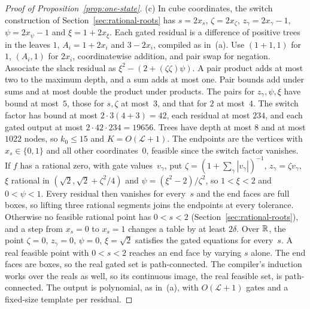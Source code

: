 \begin{proof}[Proof of Proposition~\ref{prop:one-state}]
(c) In cube coordinates, the switch construction of
Section~\ref{sec:rational-roots} has $s=2x_s$, $\zeta=2x_\zeta$,
$z_\gamma=2x_\gamma-1$, $\psi=2x_\psi-1$ and $\xi=1+2x_\xi$. Each
gated residual is a difference of positive trees in the leaves $1$,
$A_i=1+2x_i$ and $3-2x_i$, compiled as in~(a).
Use $(1+1,1)$ for $1$, $(A_i,1)$ for $2x_i$, coordinatewise addition, and
pair swap for negation. Associate the slack residual as
$\xi^2-(2+(\zeta\zeta)\psi)$. A pair product adds at most two to the
maximum depth, and a sum adds at most one. Pair bounds add under sums and
at most double the product under products. The pairs for
$z_\gamma,\psi,\xi$ have bound at most~$5$, those for $s,\zeta$ at
most~$3$, and that for $2$ at most~$4$. The switch factor has bound at
most $2\cdot3(4+3)=42$, each residual at most $234$, and each gated output
at most $2\cdot42\cdot234=19656$. Trees have depth at most $8$ and at most
$1022$ nodes, so $k_0\le15$ and $K=O(\mathcal L+1)$. The endpoints are the vertices
with $x_s\in\{0,1\}$ and all other coordinates~$0$, feasible since the
switch factor vanishes. If $f$ has a rational zero, with gate
values~$v_\gamma$, put $\zeta=(1+\sum_\gamma|v_\gamma|)^{-1}$,
$z_\gamma=\zeta v_\gamma$, $\xi$ rational in
$(\sqrt2,\sqrt2+\zeta^2/4)$ and $\psi=(\xi^2-2)/\zeta^2$, so $1<\xi<2$ and
$0<\psi<1$. Every residual then vanishes for every~$s$ and the end faces
are full boxes, so lifting three rational segments joins the endpoints at
every tolerance. Otherwise no feasible
rational point has $0<s<2$ (Section~\ref{sec:rational-roots}), and a step
from $x_s=0$ to $x_s=1$ changes a table by at least $2\delta$. Over $\mathbb{R}$,
the point $\zeta=0$, $z_\gamma=0$, $\psi=0$, $\xi=\sqrt2$ satisfies the
gated equations for every~$s$. A real feasible point with $0<s<2$ reaches an end face by varying $s$ alone. The end faces are boxes, so the real gated set is path-connected. The compiler's induction works over the reals as well, so its continuous image, the real feasible set, is path-connected. The output is polynomial, as in~(a), with $O(\mathcal L+1)$ gates and a fixed-size template per residual.
\end{proof}
